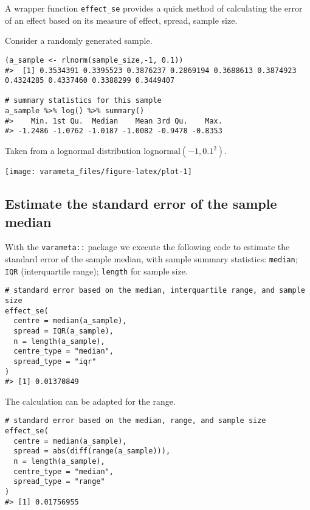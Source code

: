\documentclass[
]{article}
\begin{document}
A wrapper function \texttt{effect\_se} provides a quick method of
calculating the error of an effect based on its measure of effect,
spread, sample size.

Consider a randomly generated sample.

\begin{verbatim}
(a_sample <- rlnorm(sample_size,-1, 0.1))
#>  [1] 0.3534391 0.3395523 0.3876237 0.2869194 0.3688613 0.3874923 0.4324285 0.4337460 0.3388299 0.3449407

# summary statistics for this sample
a_sample %>% log() %>% summary()
#>    Min. 1st Qu.  Median    Mean 3rd Qu.    Max. 
#> -1.2486 -1.0762 -1.0187 -1.0082 -0.9478 -0.8353
\end{verbatim}

Taken from a lognormal distribution \(\mathrm{lognormal}(-1, 0.1^2)\).

\begin{center}\texttt{[image: varameta\_files/figure-latex/plot-1]} \end{center}

\hypertarget{estimate-the-standard-error-of-the-sample-median}{%
\subsection{Estimate the standard error of the sample
median}\label{estimate-the-standard-error-of-the-sample-median}}

With the \texttt{varameta::} package we execute the following code to
estimate the standard error of the sample median, with sample summary
statistics: \texttt{median}; \texttt{IQR} (interquartile range);
\texttt{length} for sample size.

\begin{verbatim}
# standard error based on the median, interquartile range, and sample size
effect_se(
  centre = median(a_sample),
  spread = IQR(a_sample),
  n = length(a_sample),
  centre_type = "median",
  spread_type = "iqr"
)
#> [1] 0.01370849
\end{verbatim}

The calculation can be adapted for the range.

\begin{verbatim}
# standard error based on the median, range, and sample size
effect_se(
  centre = median(a_sample),
  spread = abs(diff(range(a_sample))),
  n = length(a_sample),
  centre_type = "median",
  spread_type = "range"
)
#> [1] 0.01756955
\end{verbatim}
\end{document}
